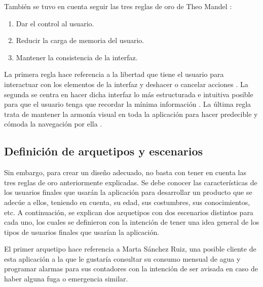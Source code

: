 \documentclass[pdftex,11pt,a4paper]{book}
\begin{document}
También se tuvo en cuenta seguir las tres reglas de oro de Theo Mandel \cite{bib:3ReglasOro}:
\vspace{-4mm}
\begin{enumerate}
\addtolength{\itemsep}{-3mm}
\item Dar el control al usuario.
\item Reducir la carga de memoria del usuario.
\item Mantener la consistencia de la interfaz.
\end{enumerate}

La primera regla hace referencia a la libertad que tiene el usuario para interactuar con los elementos de la interfaz y deshacer o cancelar acciones \cite{bib:3ReglasOro}. La segunda se centra en hacer dicha interfaz lo más estructurada e intuitiva posible para que el usuario tenga que recordar la mínima información \cite{bib:3ReglasOro}.  La última regla trata de mantener la armonía visual en toda la aplicación para hacer predecible y cómoda la navegación por ella \cite{bib:3ReglasOro}.


\subsection{Definición de arquetipos y escenarios}

Sin embargo, para crear un diseño adecuado, no basta con tener en cuenta las tres reglas de oro anteriormente explicadas. Se debe conocer las características de los usuarios finales que usarán la aplicación para desarrollar un producto que se adecúe a ellos, teniendo en cuenta, su edad, sus costumbres, sus conocimientos, etc. A continuación, se explican dos arquetipos con dos escenarios distintos para cada uno, los cuales se definieron con la intención de tener una idea general de los tipos de usuarios finales que usarían la aplicación. 


El primer arquetipo hace referencia a Marta Sánchez Ruiz, una posible cliente de esta aplicación a la que le gustaría consultar su consumo mensual de agua y programar alarmas para sus contadores con la intención de ser avisada en caso de haber alguna fuga o emergencia similar.
\end{document}
